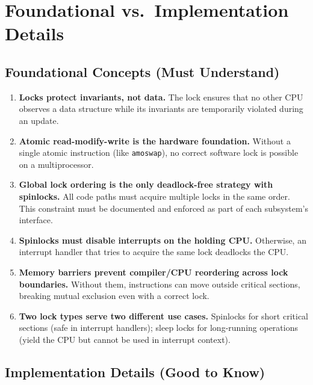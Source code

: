\documentclass[11pt, a4paper]{article}
\begin{document}
\section{Foundational vs.\ Implementation Details}

\subsection{Foundational Concepts (Must Understand)}

\begin{tcolorbox}[foundational, title={Foundational Concepts}]
\begin{enumerate}[leftmargin=1.8em, itemsep=0.3em]
  \item \textbf{Locks protect invariants, not data.} The lock ensures that no other CPU observes a data structure while its invariants are temporarily violated during an update.

  \item \textbf{Atomic read-modify-write is the hardware foundation.} Without a single atomic instruction (like \lstinline|amoswap|), no correct software lock is possible on a multiprocessor.

  \item \textbf{Global lock ordering is the only deadlock-free strategy with spinlocks.} All code paths must acquire multiple locks in the same order. This constraint must be documented and enforced as part of each subsystem's interface.

  \item \textbf{Spinlocks must disable interrupts on the holding CPU.} Otherwise, an interrupt handler that tries to acquire the same lock deadlocks the CPU.

  \item \textbf{Memory barriers prevent compiler/CPU reordering across lock boundaries.} Without them, instructions can move outside critical sections, breaking mutual exclusion even with a correct lock.

  \item \textbf{Two lock types serve two different use cases.} Spinlocks for short critical sections (safe in interrupt handlers); sleep locks for long-running operations (yield the CPU but cannot be used in interrupt context).
\end{enumerate}
\end{tcolorbox}

\subsection{Implementation Details (Good to Know)}
\end{document}
